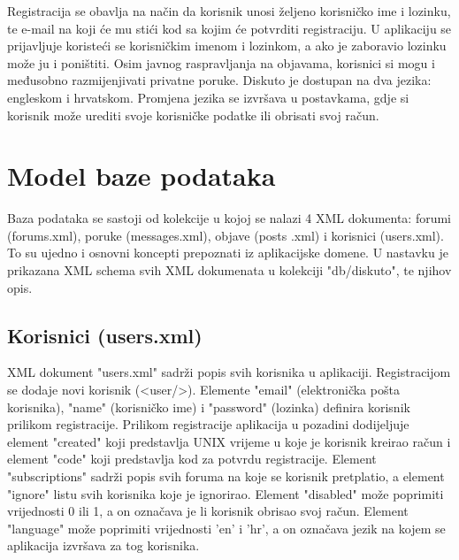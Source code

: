 \documentclass{foi}
\begin{document}
Registracija se obavlja na način da korisnik unosi željeno korisničko ime i lozinku, te e-mail na koji će mu stići kod sa kojim će potvrditi registraciju. U aplikaciju se prijavljuje koristeći se korisničkim imenom i lozinkom, a ako je zaboravio lozinku može ju i poništiti. Osim javnog raspravljanja na objavama, korisnici si mogu i međusobno razmijenjivati privatne poruke. Diskuto je dostupan na dva jezika: engleskom i hrvatskom. Promjena jezika se izvršava u postavkama, gdje si korisnik može urediti svoje korisničke podatke ili obrisati svoj račun.

\chapter{Model baze podataka}

Baza podataka se sastoji od kolekcije u kojoj se nalazi 4 XML dokumenta: forumi (forums.xml), poruke (messages.xml), objave (posts .xml) i korisnici (users.xml). To su ujedno i osnovni koncepti prepoznati iz aplikacijske domene. U nastavku je prikazana XML schema svih XML dokumenata u kolekciji "db/diskuto", te njihov opis.

\section{Korisnici (users.xml)}

XML dokument "users.xml" sadrži popis svih korisnika u aplikaciji. Registracijom se dodaje novi korisnik (<user/>). Elemente "email" (elektronička pošta korisnika), "name" (korisničko ime) i "password" (lozinka) definira korisnik prilikom registracije. Prilikom registracije aplikacija u pozadini dodijeljuje element "created" koji predstavlja UNIX vrijeme u koje je korisnik kreirao račun i element "code" koji predstavlja kod za potvrdu registracije. Element "subscriptions" sadrži popis svih foruma na koje se korisnik pretplatio, a element "ignore" listu svih korisnika koje je ignorirao. Element "disabled" može poprimiti vrijednosti 0 ili 1, a on označava je li korisnik obrisao svoj račun. Element "language" može poprimiti vrijednosti 'en' i 'hr', a on označava jezik na kojem se aplikacija izvršava za tog korisnika.
\end{document}
